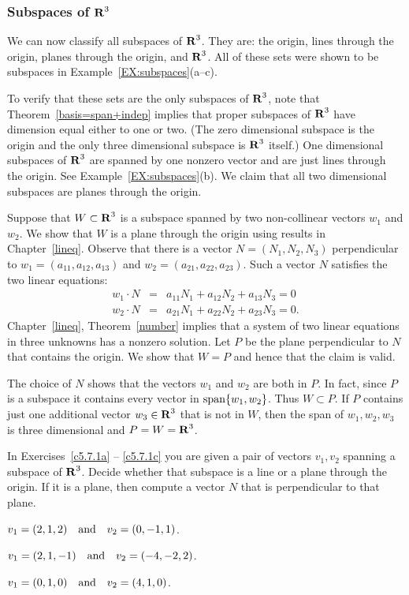 \documentclass{ximera}
\begin{document}
\subsubsection*{Subspaces of $\mbox{$\bf{R}$}^3$}

We can now classify all subspaces of $\mbox{$\bf{R}$}^3$.  They are:  the origin, lines
through the origin, planes through the origin, and $\mbox{$\bf{R}$}^3$.  All of these
sets were shown to be subspaces in Example~\ref{EX:subspaces}(a--c).

To verify that these sets are the only subspaces of $\mbox{$\bf{R}$}^3$, note that
Theorem~\ref{basis=span+indep} implies that proper subspaces of $\mbox{$\bf{R}$}^3$ have
dimension equal either to one or two. (The zero dimensional subspace is the
origin and the only three dimensional subspace is $\mbox{$\bf{R}$}^3$ itself.)  One
dimensional subspaces of $\mbox{$\bf{R}$}^3$ are spanned by one nonzero vector and are just
lines through the origin.  See Example~\ref{EX:subspaces}(b).  We claim that
all two dimensional subspaces are planes through the origin.

Suppose that $W\subset\mbox{$\bf{R}$}^3$ is a subspace spanned by two non-collinear vectors
$w_1$ and $w_2$.  We show that $W$ is a plane 
through the origin using results in Chapter~\ref{lineq}.  Observe that there
is a vector $N=(N_1,N_2,N_3)$ perpendicular to $w_1=(a_{11},a_{12},a_{13})$
and $w_2=(a_{21},a_{22},a_{23})$.  Such a vector $N$ satisfies the two linear
equations:
\begin{eqnarray*}
w_1\cdot N & = & a_{11}N_1 + a_{12}N_2 + a_{13}N_3 = 0 \\
w_2\cdot N & = & a_{21}N_1 + a_{22}N_2 + a_{23}N_3 = 0.
\end{eqnarray*}
Chapter~\ref{lineq}, Theorem~\ref{number} implies that a system of two linear
equations in three unknowns has a nonzero solution.  Let $P$ be the plane
perpendicular  to $N$ that contains the origin.  We show
that $W=P$ and hence that the claim is valid.

The choice of $N$ shows that the vectors $w_1$ and $w_2$ are both in $P$. In
fact, since $P$ is a subspace it contains every vector in ${\rm span}\{w_1,w_2\}$.
Thus $W\subset P$.  If $P$ contains just one additional vector $w_3\in\mbox{$\bf{R}$}^3$
that is not in $W$, then the span of $w_1,w_2,w_3$ is three dimensional and
$P=W=\mbox{$\bf{R}$}^3$.



\EXER

\TEXER



\noindent In Exercises~\ref{c5.7.1a} -- \ref{c5.7.1c} you are
given a pair of vectors $v_1,v_2$ spanning a subspace of $\mbox{$\bf{R}$}^3$.
Decide whether that subspace is a line or a plane through the
origin.  If it is a plane, then compute a vector $N$ that is
perpendicular to that plane.
\begin{exercise} \label{c5.7.1a}
$v_1=(2,1,2) \quad\mbox{and}\quad v_2=(0,-1,1)$.
\end{exercise}
\begin{exercise} \label{c5.7.1b}
$v_1=(2,1,-1) \quad\mbox{and}\quad v_2=(-4,-2,2)$.
\end{exercise}
\begin{exercise} \label{c5.7.1c}
$v_1=(0,1,0) \quad\mbox{and}\quad v_2=(4,1,0)$.
\end{exercise}
\end{document}

